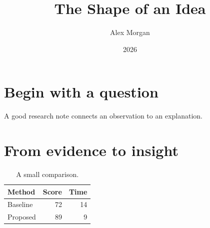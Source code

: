 \documentclass{tufte-handout}
\title{The Shape of an Idea}\author{Alex Morgan}\date{2026}
\begin{document}
\maketitle

\section{Begin with a question}
A good research note connects an observation to an explanation.
\lipsum[1-2]
\begin{marginfigure}\centering
\fbox{\rule{0pt}{25mm}\rule{0.8\linewidth}{0pt}}
\caption{Replace this placeholder with a figure.}\end{marginfigure}
\section{From evidence to insight}\lipsum[3-4]
\begin{table}[h]\centering\begin{tabular}{lrr}\toprule Method & Score & Time\\\midrule Baseline & 72 & 14\\Proposed & 89 & 9\\\bottomrule\end{tabular}\caption{A small comparison.}\end{table}
\end{document}
